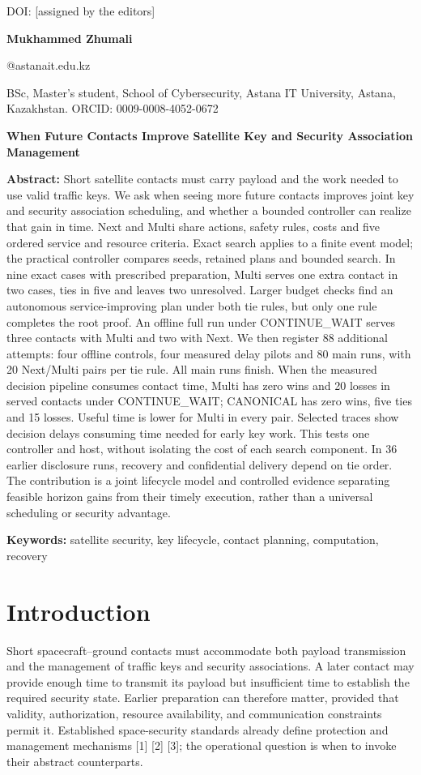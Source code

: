 \documentclass[12pt,a4paper]{article}
\begin{document}
\noindent DOI: [assigned by the editors]\par
\noindent\textbf{Mukhammed Zhumali}\par
{}@astanait.edu.kz\par
\noindent BSc, Master's student, School of Cybersecurity, Astana IT University, Astana, Kazakhstan. ORCID: 0009-0008-4052-0672\par
\begin{center}\textbf{When Future Contacts Improve Satellite Key and Security Association Management}\end{center}
\textbf{Abstract:} Short satellite contacts must carry payload and the work needed to use valid traffic keys. We ask when seeing more future contacts improves joint key and security association scheduling, and whether a bounded controller can realize that gain in time. Next and Multi share actions, safety rules, costs and five ordered service and resource criteria. Exact search applies to a finite event model; the practical controller compares seeds, retained plans and bounded search. In nine exact cases with prescribed preparation, Multi serves one extra contact in two cases, ties in five and leaves two unresolved. Larger budget checks find an autonomous service-improving plan under both tie rules, but only one rule completes the root proof. An offline full run under CONTINUE\_WAIT serves three contacts with Multi and two with Next. We then register 88 additional attempts: four offline controls, four measured delay pilots and 80 main runs, with 20 Next/Multi pairs per tie rule. All main runs finish. When the measured decision pipeline consumes contact time, Multi has zero wins and 20 losses in served contacts under CONTINUE\_WAIT; CANONICAL has zero wins, five ties and 15 losses. Useful time is lower for Multi in every pair. Selected traces show decision delays consuming time needed for early key work. This tests one controller and host, without isolating the cost of each search component. In 36 earlier disclosure runs, recovery and confidential delivery depend on tie order. The contribution is a joint lifecycle model and controlled evidence separating feasible horizon gains from their timely execution, rather than a universal scheduling or security advantage.

\textbf{Keywords:} satellite security, key lifecycle, contact planning, computation, recovery

\section*{Introduction}
Short spacecraft--ground contacts must accommodate both payload transmission and the management of traffic keys and security associations. A later contact may provide enough time to transmit its payload but insufficient time to establish the required security state. Earlier preparation can therefore matter, provided that validity, authorization, resource availability, and communication constraints permit it. Established space-security standards already define protection and management mechanisms [1] [2] [3]; the operational question is when to invoke their abstract counterparts.
\end{document}
